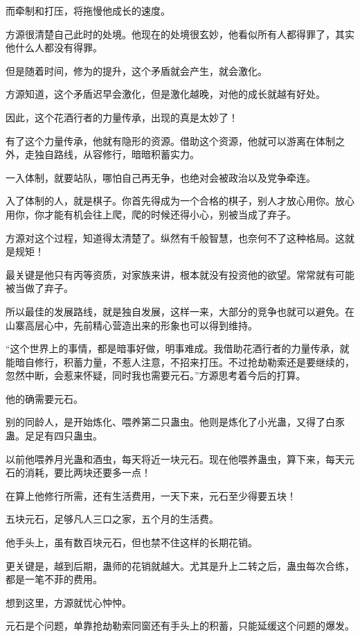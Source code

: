 \begin{this_body}
而牵制和打压，将拖慢他成长的速度。

方源很清楚自己此时的处境。他现在的处境很玄妙，他看似所有人都得罪了，其实他什么人都没有得罪。

但是随着时间，修为的提升，这个矛盾就会产生，就会激化。

方源知道，这个矛盾迟早会激化，但是激化越晚，对他的成长就越有好处。

因此，这个花酒行者的力量传承，出现的真是太妙了！

有了这个力量传承，他就有隐形的资源。借助这个资源，他就可以游离在体制之外，走独自路线，从容修行，暗暗积蓄实力。

一入体制，就要站队，哪怕自己再无争，也绝对会被政治以及党争牵连。

入了体制的人，就是棋子。你首先得成为一个合格的棋子，别人才放心用你。放心用你，你才能有机会往上爬，爬的时候还得小心，别被当成了弃子。

方源对这个过程，知道得太清楚了。纵然有千般智慧，也奈何不了这种格局。这就是规矩！

最关键是他只有丙等资质，对家族来讲，根本就没有投资他的欲望。常常就有可能被当做了弃子。

所以最佳的发展路线，就是独自发展，这样一来，大部分的竞争也就可以避免。在山寨高层心中，先前精心营造出来的形象也可以得到维持。

“这个世界上的事情，都是暗事好做，明事难成。我借助花酒行者的力量传承，就能暗自修行，积蓄力量，不惹人注意，不招来打压。不过抢劫勒索还是要继续的，忽然中断，会惹来怀疑，同时我也需要元石。”方源思考着今后的打算。

他的确需要元石。

别的同龄人，是开始炼化、喂养第二只蛊虫。他则是炼化了小光蛊，又得了白豕蛊。足足有四只蛊虫。

以前他喂养月光蛊和酒虫，每天将近一块元石。现在他喂养蛊虫，算下来，每天元石的消耗，要比两块还要多一点！

在算上他修行所需，还有生活费用，一天下来，元石至少得要五块！

五块元石，足够凡人三口之家，五个月的生活费。

他手头上，虽有数百块元石，但也禁不住这样的长期花销。

更关键是，越到后期，蛊师的花销就越大。尤其是升上二转之后，蛊虫每次合练，都是一笔不菲的费用。

想到这里，方源就忧心忡忡。

元石是个问题，单靠抢劫勒索同窗还有手头上的积蓄，只能延缓这个问题的爆发。


\end{this_body}
